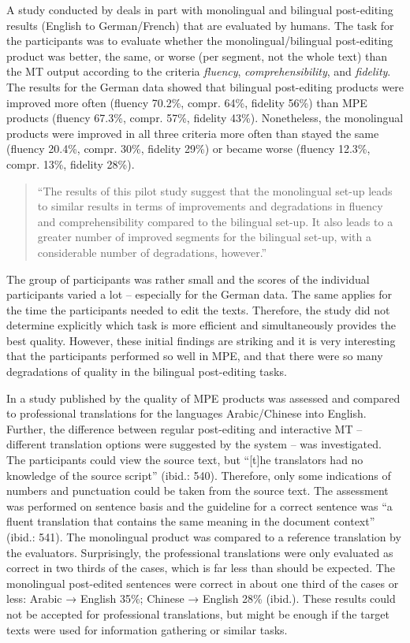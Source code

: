 \documentclass[output=paper]{langsci/langscibook}
\begin{document}
A study conducted by \citet{mitchell2013} deals in part with monolingual and bilingual post-editing results (English to German/French) that are evaluated by humans. The task for the participants was to evaluate whether the monolingual/bilingual post-editing product was better, the same, or worse (per segment, not the whole text) than the MT output according to the criteria \textit{fluency}, \textit{comprehensibility}, and \textit{fidelity}. The results for the German data showed that bilingual post-editing products were improved more often (fluency 70.2\%, compr. 64\%, fidelity 56\%) than MPE products (fluency 67.3\%, compr. 57\%, fidelity 43\%). Nonetheless, the monolingual products were improved in all three criteria more often than stayed the same (fluency 20.4\%, compr. 30\%, fidelity 29\%) or became worse (fluency 12.3\%, compr. 13\%, fidelity 28\%).


\begin{quotation}
``The results of this pilot study suggest that the monolingual set-up leads to similar results in terms of improvements and degradations in fluency and comprehensibility compared to the bilingual set-up. It also leads to a greater number of improved segments for the bilingual set-up, with a considerable number of degradations, however.'' \citep[4]{mitchell2013}\end{quotation}

The group of participants was rather small and the scores of the individual participants varied a lot -- especially for the German data. The same applies for the time the participants needed to edit the texts. Therefore, the study did not determine explicitly which task is more efficient and simultaneously provides the best quality. However, these initial findings are striking and it is very interesting that the participants performed so well in MPE, and that there were so many degradations of quality in the bilingual post-editing tasks.



In a study published by \citet{Koehn2010} the quality of MPE products was assessed and compared to professional translations for the languages Arabic/Chinese into English. Further, the difference between regular post-editing and interactive MT -- different translation options were suggested by the system -- was investigated. The participants could view the source text, but ``[t]he translators had no knowledge of the source script'' (ibid.: 540). Therefore, only some indications of numbers and punctuation could be taken from the source text. The assessment was performed on sentence basis and the guideline for a correct sentence was ``a fluent translation that contains the same meaning in the document context'' (ibid.: 541). The monolingual product was compared to a reference translation by the evaluators. Surprisingly, the professional translations were only evaluated as correct in two thirds of the cases, which is far less than should be expected. The monolingual post-edited sentences were correct in about one third of the cases or less: Arabic → English 35\%; Chinese → English 28\% (ibid.). These results could not be accepted for professional translations, but might be enough if the target texts were used for information gathering or similar tasks.
\end{document}
